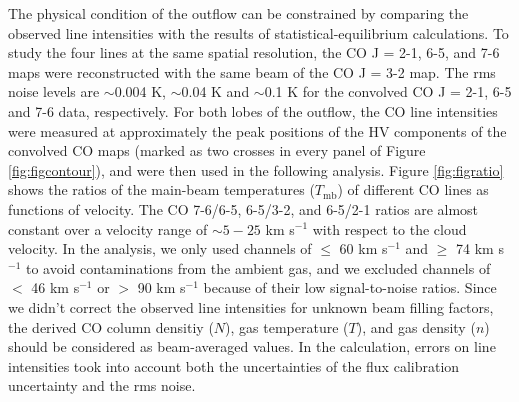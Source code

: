 The physical condition of the outflow can be constrained by comparing the observed line intensities with the results of statistical-equilibrium calculations. To study the four lines at the same spatial resolution, the CO J = 2-1, 6-5, and 7-6 maps were reconstructed with the same beam of the CO J = 3-2 map. The rms noise levels are $\sim$0.004 K, $\sim$0.04 K and $\sim$0.1 K for the convolved CO J = 2-1, 6-5 and 7-6 data, respectively. For both lobes of the outflow, the CO line intensities were measured at approximately the peak positions of the HV components of the convolved CO maps (marked as two crosses in every panel of Figure \ref{fig:figcontour}), and were then used in the following analysis. Figure \ref{fig:figratio} shows the ratios of the main-beam temperatures ($T_{\mathrm{mb}}$) of different CO lines as functions of velocity. The CO 7-6/6-5, 6-5/3-2, and 6-5/2-1 ratios are almost constant over a velocity range of $\sim 5-25$ km s$^{-1}$ with respect to the cloud velocity. In the analysis, we only used channels of $\le$ 60 km s$^{-1}$ and $\ge$ 74 km s$^{-1}$ to avoid contaminations from the ambient gas, and we excluded channels of $<$ 46 km s$^{-1}$ or $>$ 90 km s$^{-1}$ because of their low signal-to-noise ratios. Since we didn't correct the observed line intensities for unknown beam filling factors, the derived CO column densitiy ($N$), gas temperature ($T$), and gas density ($n$) should be considered as beam-averaged values. In the calculation, errors on line intensities took into account both the uncertainties of the flux calibration uncertainty and the rms noise. 



